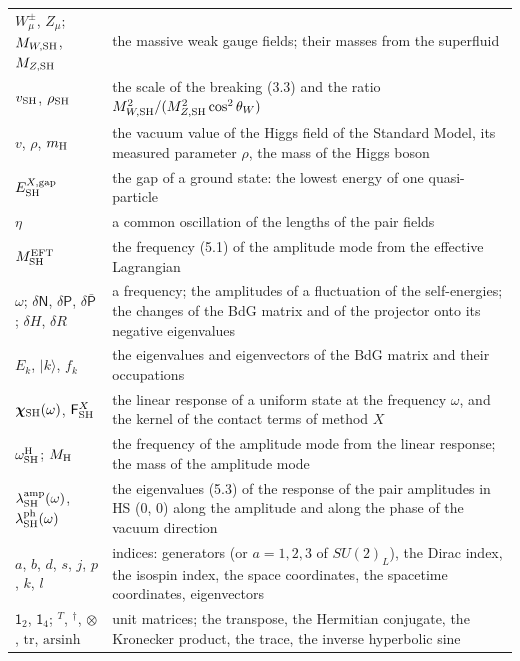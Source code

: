 \documentclass[
  10pt,
]{article}
\begin{document}
\begin{longtable}[]{@{}
  >{\raggedright\arraybackslash}p{}
  >{\raggedright\arraybackslash}p{}@{}}
\(W^\pm_\mu\), \(Z_\mu\); \(M_{W,{\rm SH}}\), \(M_{Z,{\rm SH}}\) & the
massive weak gauge fields; their masses from the superfluid \\
\(v_{\rm SH}\), \(\rho_{\rm SH}\) & the scale of the breaking (3.3) and
the ratio \(M_{W,{\rm SH}}^2/(M_{Z,{\rm SH}}^2\cos^2\theta_W)\) \\
\(v\), \(\rho\), \(m_{\rm H}\) & the vacuum value of the Higgs field of
the Standard Model, its measured parameter \(\rho\), the mass of the
Higgs boson \\
\(E^{X,{\rm gap}}_{\rm SH}\) & the gap of a ground state: the lowest
energy of one quasi-particle \\
\(\eta\) & a common oscillation of the lengths of the pair fields \\
\(M^{\rm EFT}_{\rm SH}\) & the frequency (5.1) of the amplitude mode
from the effective Lagrangian \\
\(\omega\); \(\delta\mathsf N\), \(\delta\mathsf P\),
\(\delta\bar{\mathsf P}\); \(\delta H\), \(\delta R\) & a frequency; the
amplitudes of a fluctuation of the self-energies; the changes of the BdG
matrix and of the projector onto its negative eigenvalues \\
\(E_k\), \(\lvert k\rangle\), \(f_k\) & the eigenvalues and eigenvectors
of the BdG matrix and their occupations \\
\(\boldsymbol\chi_{\rm SH}(\omega)\), \(\mathsf F^X_{\rm SH}\) & the
linear response of a uniform state at the frequency \(\omega\), and the
kernel of the contact terms of method \(X\) \\
\(\omega^{\rm H}_{\rm SH}\); \(M_{\rm H}\) & the frequency of the
amplitude mode from the linear response; the mass of the amplitude
mode \\
\(\lambda^{\rm amp}_{\rm SH}(\omega)\),
\(\lambda^{\rm ph}_{\rm SH}(\omega)\) & the eigenvalues (5.3) of the
response of the pair amplitudes in HS (0, 0) along the amplitude and
along the phase of the vacuum direction \\
\(a\), \(b\), \(d\), \(s\), \(j\), \(p\), \(k\), \(l\) & indices:
generators (or \(a=1,2,3\) of \(SU(2)_L\)), the Dirac index, the isospin
index, the space coordinates, the spacetime coordinates, eigenvectors \\
\(\mathsf 1_2\), \(\mathsf 1_4\); \({}^T\), \({}^\dagger\), \(\otimes\),
\(\mathrm{tr}\), \(\mathrm{arsinh}\) & unit matrices; the transpose, the
Hermitian conjugate, the Kronecker product, the trace, the inverse
hyperbolic sine \\
\end{longtable}
\end{document}

